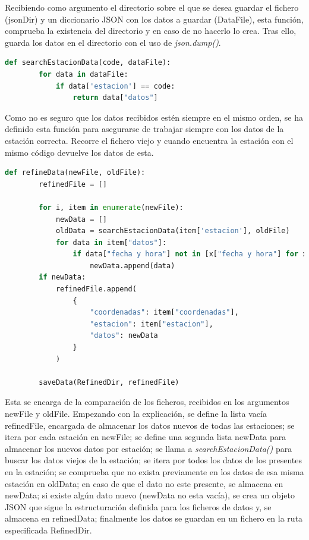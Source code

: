 Recibiendo como argumento el directorio sobre el que se desea guardar el fichero (jsonDir) y un diccionario JSON con los datos a guardar (DataFile), esta función, comprueba la existencia del directorio y en caso de no hacerlo lo crea. Tras ello, guarda los datos en el directorio con el uso de \textit{json.dump()}.

\begin{lstlisting}[language=Python, caption={Declaración función searchEstacionData()}]
	def searchEstacionData(code, dataFile):
		for data in dataFile:
			if data['estacion'] == code:
				return data["datos"]
\end{lstlisting}

Como no es seguro que los datos recibidos estén siempre en el mismo orden, se ha definido esta función para asegurarse de trabajar siempre con los datos de la estación correcta. Recorre el fichero viejo y cuando encuentra la estación con el mismo código devuelve los datos de esta.

\begin{lstlisting}[language=Python, caption={Declaración función refinedData()}]
	def refineData(newFile, oldFile):
		refinedFile = []
		
		for i, item in enumerate(newFile):
			newData = []
			oldData = searchEstacionData(item['estacion'], oldFile)
			for data in item["datos"]:
				if data["fecha y hora"] not in [x["fecha y hora"] for x in oldData]:
					newData.append(data)
		if newData:
			refinedFile.append(
				{
					"coordenadas": item["coordenadas"],
					"estacion": item["estacion"],
					"datos": newData
				}
			)
		
		saveData(RefinedDir, refinedFile)
\end{lstlisting}

Esta se encarga de la comparación de los ficheros, recibidos en los argumentos newFile y oldFile.\newline
\newline
Empezando con la explicación, se define la lista vacía refinedFile, encargada de almacenar los datos nuevos de todas las estaciones; se itera por cada estación en newFile; se define una segunda lista newData para almacenar los nuevos datos por estación; se llama a \textit{searchEstacionData()} para buscar los datos viejos de la estación; se itera por todos los datos de los presentes en la estación; se comprueba que no exista previamente en los datos de esa misma estación en oldData; en caso de que el dato no este presente, se almacena en newData; si existe algún dato nuevo (newData no esta vacía), se crea un objeto JSON que sigue la estructuración definida para los ficheros de datos y, se almacena en refinedData; finalmente los datos se guardan en un fichero en la ruta especificada RefinedDir.

